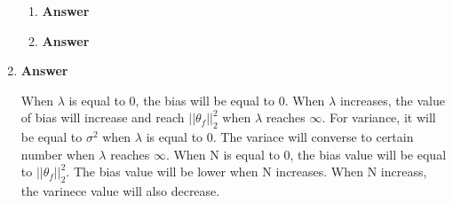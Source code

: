 \documentclass[11pt]{article}
\begin{document}
\begin{enumerate}[label=(\alph*)]
\begin{enumerate}[label=(\roman*)]
\item  \textbf{Answer}

\item  \textbf{Answer}

\end{enumerate}



\item  \textbf{Answer}

When $\lambda$ is equal to 0, the bias will be equal to $0$. When $\lambda$ increases, the value of bias will increase and reach $||\theta_f||_2^2$ when $\lambda$ reaches $\infty$. For variance, it will be equal to $\sigma^2$ when $\lambda$ is equal to 0. The variace will converse to certain number when $\lambda$ reaches $\infty$.
When N is equal to 0, the bias value will be equal to $||\theta_f||_2^2$. The bias value will be lower when N increases. When N increass, the varinece value will also decrease.

\end{enumerate}
\end{document}

